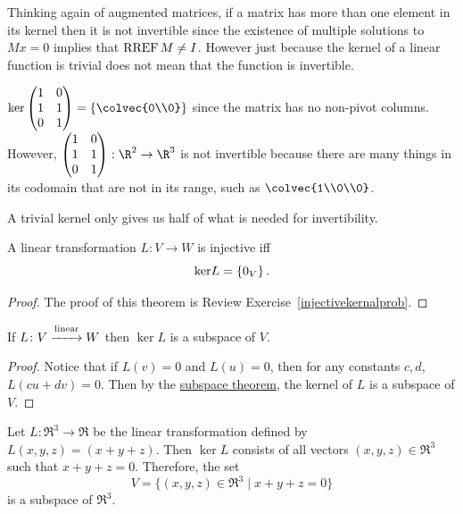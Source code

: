 Thinking again of augmented matrices, 
if a matrix has more than one element in its kernel then it is not invertible since the existence of multiple solutions to $Mx=0$ implies that ${\rm RREF} \,M\neq I$. 
However just because the kernel of a linear function is trivial does not mean that the function is invertible. 

\begin{example}
$\ker 
\begin{pmatrix}
1&0\\
1&1\\
0&1
\end{pmatrix} =\left\{  \colvec{0\\0} \right\} $
since the matrix has no non-pivot columns. However, 
$\begin{pmatrix}
1&0\\
1&1\\
0&1
\end{pmatrix}:  \R^2 \to \R^3$
is not invertible because there are many things in its codomain that are not in its range, such as  $\colvec{1\\0\\0}$. 
\end{example}

A trivial kernel only gives us half of what is needed for invertibility.




\begin{theorem}
A linear transformation $L\colon V\rightarrow W$ is injective iff \[{\rm ker} L=\{0_V\}\, .\]
\end{theorem}

\begin{proof}
The proof of this theorem is Review Exercise~\ref{injectivekernalprob}.
\end{proof}



\begin{theorem}
If $L \colon V\stackrel{\rm linear}{-\!\!\!-\!\!\!-\!\!\!\rightarrow} W$  then $\ker L$ is a subspace of $V$.
\end{theorem}

\begin{proof}
Notice that if $L(v)=0$ and $L(u)=0$, then for any constants $c,d$, $L(cu+dv)=0$.  Then by the \hyperref[subspacetheorem]{subspace theorem}, the kernel of $L$ is a subspace of $V$.
\end{proof}

\begin{example}
Let \(L \colon \Re^3 \to \Re\) be the linear transformation defined by \(L(x,y,z)=(x+y+z)\). Then \(\ker L\) consists of all vectors \((x,y,z) \in \Re^3\) such that \(x+y+z=0\). Therefore, the set
\[
V=\{(x,y,z) \in \Re^3 \mid x+y+z=0\}
\]
is a subspace of \(\Re^3\).
\end{example}

